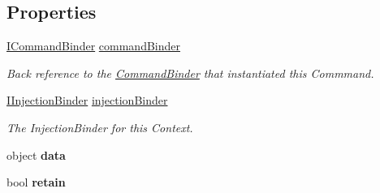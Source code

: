 \subsection*{Properties}
\begin{DoxyCompactItemize}
\item 
\hypertarget{classstrange_1_1extensions_1_1command_1_1impl_1_1_command_a97536a752bfdb962d4b6a9fe31888472}{\hyperlink{interfacestrange_1_1extensions_1_1command_1_1api_1_1_i_command_binder}{I\-Command\-Binder} \hyperlink{classstrange_1_1extensions_1_1command_1_1impl_1_1_command_a97536a752bfdb962d4b6a9fe31888472}{command\-Binder}}\label{classstrange_1_1extensions_1_1command_1_1impl_1_1_command_a97536a752bfdb962d4b6a9fe31888472}

\begin{DoxyCompactList}\small\item\em Back reference to the \hyperlink{classstrange_1_1extensions_1_1command_1_1impl_1_1_command_binder}{Command\-Binder} that instantiated this Commmand. \end{DoxyCompactList}\item 
\hypertarget{classstrange_1_1extensions_1_1command_1_1impl_1_1_command_a6cddeeed15d2f3bb2b434ae7f8450fd4}{\hyperlink{interfacestrange_1_1extensions_1_1injector_1_1api_1_1_i_injection_binder}{I\-Injection\-Binder} \hyperlink{classstrange_1_1extensions_1_1command_1_1impl_1_1_command_a6cddeeed15d2f3bb2b434ae7f8450fd4}{injection\-Binder}}\label{classstrange_1_1extensions_1_1command_1_1impl_1_1_command_a6cddeeed15d2f3bb2b434ae7f8450fd4}

\begin{DoxyCompactList}\small\item\em The Injection\-Binder for this Context. \end{DoxyCompactList}\item 
\hypertarget{classstrange_1_1extensions_1_1command_1_1impl_1_1_command_af313eea4d80d65db2a526d5ce28712e8}{object {\bfseries data}}\label{classstrange_1_1extensions_1_1command_1_1impl_1_1_command_af313eea4d80d65db2a526d5ce28712e8}

\item 
\hypertarget{classstrange_1_1extensions_1_1command_1_1impl_1_1_command_adf51b3ae205b21b57e76ba3aad11bc74}{bool {\bfseries retain}}\label{classstrange_1_1extensions_1_1command_1_1impl_1_1_command_adf51b3ae205b21b57e76ba3aad11bc74}

\end{DoxyCompactItemize}


